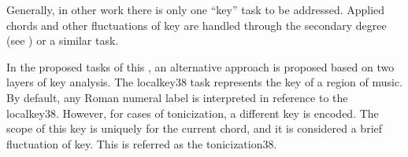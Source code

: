
Generally, in other work \textcite{chen2018functional,
chen2019harmony, micchi2020not, micchi2021deep,
mcleod2021modular} there is only one ``key'' task to be
addressed. Applied chords and other fluctuations of key are
handled through the secondary degree (see
) or a similar task.

In the proposed tasks of this \thesisdiss{}, an alternative
approach is proposed based on two layers of key analysis.
The \gls{localkey38} task represents the key of a region of
music. By default, any Roman numeral label is interpreted in
reference to the \gls{localkey38}. However, for cases of
tonicization, a different key is encoded. The scope of this
key is uniquely for the current chord, and it is considered
a brief fluctuation of key. This is referred as the
\gls{tonicization38}.
